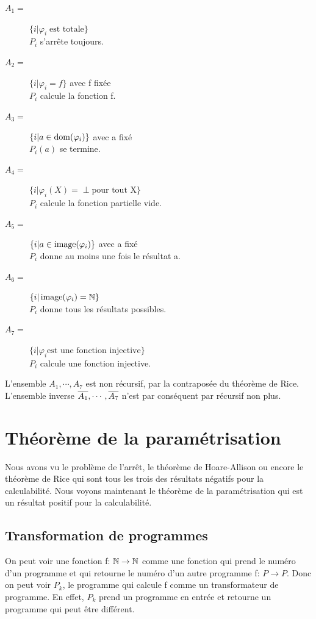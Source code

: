 \begin{description}
	\item[$A_1 =$] $\{i| \varphi_i \; \text{est totale}\}$ \\
	 				$P_i$ s'arrête toujours.
	\item[$A_2 =$] $\{i| \varphi_i = f\}$ avec f fixée \\
					$P_i$ calcule la fonction f.
	\item[$A_3 =$] $\{i| a \in \operatorname{dom}(\varphi_i)\}$ avec a fixé \\
					$P_i(a)$ se termine.
	\item[$A_4 =$] $\{i| \varphi_i(X) = \perp \text{pour tout X}\}$ \\
					$P_i$ calcule la fonction partielle vide.
	\item[$A_5 =$] $\{i| a \in \operatorname{image}(\varphi_i)\}$ avec a fixé \\
					$P_i$ donne au moins une fois le résultat a.
	\item[$A_6 =$] $\{i| \operatorname{image}(\varphi_i) = \mathbb{N}\}$ \\
					$P_i$ donne tous les résultats possibles.
	\item[$A_7 =$] $\{i| \varphi_i \text{est une fonction injective}\}$ \\
					$P_i$ calcule une fonction injective.
\end{description}

L'ensemble $A_1, \cdots, A_7$ est non récursif, par la contraposée du théorème de Rice. L'ensemble inverse $\overline{A_1}, \cdots, \overline{A_7}$ n'est par conséquent par récursif non plus.


\section{Théorème de la paramétrisation}
\label{sec:th_or_me_de_la_param_trisation}
Nous avons vu le problème de l'arrêt, le théorème de Hoare-Allison ou encore le théorème de Rice qui sont tous les trois des résultats négatifs pour la calculabilité. Nous voyons maintenant le théorème de la paramétrisation qui est un résultat positif pour la calculabilité.
\subsection{Transformation de programmes}
\label{sub:transformation_de_programmes}
\begin{mydef}
	On peut voir une fonction f: $\mathbb{N} \rightarrow \mathbb{N}$ comme une fonction qui prend
	le numéro d'un programme et qui retourne le numéro d'un autre programme f: $P
	\rightarrow P$. Donc on peut voir $P_k$, le programme qui calcule f comme un
	transformateur de programme. En effet, $P_k$ prend un programme en entrée et
	retourne un programme qui peut être différent.
\end{mydef}

